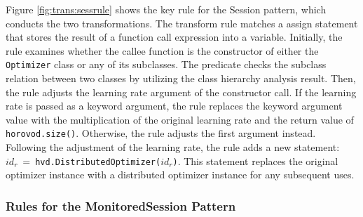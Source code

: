 Figure \ref{fig:trans:sessrule} shows the key rule for the Session pattern,
which conducts the two transformations.
The transform rule matches a assign statement that stores the result of a
function call expression into a variable.
Initially, the rule examines whether the callee function is the constructor of
either the {\tt Optimizer} class or any of its subclasses.
The predicate \ktsubtysubs{\smodenv} checks the subclass relation between two
classes by utilizing the class hierarchy analysis result.
Then, the rule adjusts the learning rate argument of the constructor call. 
If the learning rate is passed as a keyword argument, the rule replaces the
keyword argument value with the multiplication of the original learning rate
and the return value of {\tt horovod.size()}.
Otherwise, the rule adjusts the first argument instead.
Following the adjustment of the learning rate, the rule adds a new statement:
$id_r\ =\ ${\tt hvd.DistributedOptimizer($id_r$)}. 
This statement replaces the original optimizer instance with a distributed
optimizer instance for any subsequent uses.



\subsubsection{Rules for the MonitoredSession Pattern}


